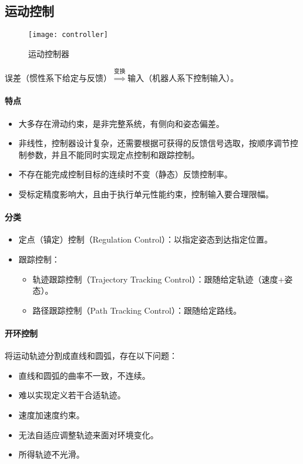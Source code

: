 \documentclass[
12pt, %
a4paper, 
oneside, %
headinclude,footinclude, %
]{scrartcl}
\begin{document}
\subsection[运动控制]{运动控制}\label{sec:motion_control}
\begin{figure}[H]
\centering 
\texttt{[image: controller]} 
\caption{运动控制器}
\end{figure}

误差（惯性系下给定与反馈）$ \overset{\text{变换}}{\Longrightarrow} $输入（机器人系下控制输入）。 
\paragraph{特点}
\begin{itemize}
\item 大多存在滑动约束，是非完整系统，有侧向和姿态偏差。
\item 非线性，控制器设计复杂，还需要根据可获得的反馈信号选取，按顺序调节控制参数，并且不能同时实现定点控制和跟踪控制。
\item 不存在能完成控制目标的连续时不变（静态）反馈控制率。
\item 受标定精度影响大，且由于执行单元性能约束，控制输入要合理限幅。
\end{itemize}
\paragraph{分类}
\begin{itemize}
\item 定点（镇定）控制（Regulation Control）：以指定姿态到达指定位置。
\item 跟踪控制：
\begin{itemize}
\item 轨迹跟踪控制（Trajectory Tracking Control）：跟随给定轨迹（速度+姿态）。
\item 路径跟踪控制（Path Tracking Control）：跟随给定路线。
\end{itemize}
\end{itemize}
\paragraph{开环控制}
将运动轨迹分割成直线和圆弧，存在以下问题：
\begin{itemize}
\item 直线和圆弧的曲率不一致，不连续。
\item 难以实现定义若干合适轨迹。
\item 速度加速度约束。
\item 无法自适应调整轨迹来面对环境变化。
\item 所得轨迹不光滑。
\end{itemize}
\end{document}
